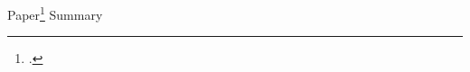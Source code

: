 \documentclass[UTF8,a4paper,10pt]{article}
\begin{document}

  



Paper\Footcite{Pawitan1993} Summary
\end{document}
